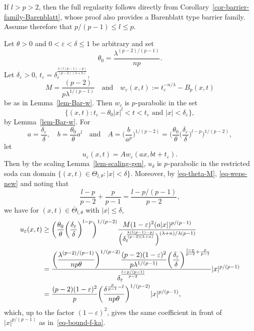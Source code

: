 \documentclass[a4paper, twoside]{article}
\makeatletter
\theoremstyle{propositional}
\theoremstyle{descriptive}
\renewenvironment{proof}[1][\proofname]{\par
  \pushQED{\qed}%
  \normalfont
  \trivlist
  \item[\hskip\labelsep
        \itshape
    #1\@addpunct{.}]\ignorespaces
}{%
  \popQED\endtrivlist\@endpefalse
}
\numberwithin{equation}{section}
\newcommand{\eps}{\varepsilon}
\newcommand{\de}{\delta}
\newcommand{\p}{{$p\mspace{1mu}$}}
\newcommand{\la}{\lambda}
\makeatother
\begin{document}
\begin{proof}[Second proof of Proposition~\ref{prop-small-reg},
based on Barenblatt type barriers]
If $l >p>2$, then the full regularity follows
directly from Corollary~\ref{cor-barrier-family-Barenblatt},
whose proof also provides a Barenblatt type barrier family.
Assume therefore that $p/(p-1)\le l\le p$.

Let 
$\theta>0$ and $0<\eps < \de \le1$  be arbitrary and set
\[
\theta_0 =\frac{\la^{(p-2)/(p-1)}}{np}.
\]
Let $\de_\eps>0$, $t_\eps= \de_\eps^{\frac{\la (l(p-1)-p)}{(p-2)(\la+n)}}$, 
\[
   M = \frac{(p-2)}{p \la^{1/(p-1)}}
  \quad \text{and} \quad 
w_\eps(x,t):= t_\eps^{-n/\la} - B_p(x,t)
\]
be as in Lemma~\ref{lem-Bar-w}.
Then $w_\eps$ is \p-parabolic in the set
 \[
\{(x,t): t_\eps - \theta_0 |x|^l< t < t_\eps
\text{ and }  |x| <  \de_\eps\}, 
\]
by Lemma~\ref{lem-Bar-w}.
For
\[
a=\frac{\de_\eps}{\de}, \quad 
b= \frac{\theta_0}{\theta} a^l  
\quad \text{and} \quad
A = \biggl( \frac{b}{a^p} \biggr)^{1/(p-2)} 
= \biggl( \frac{\theta_0}{\theta} \biggl( \frac{\de_\eps}{\de} \biggr)^{l-p} \biggr)^{1/(p-2)},
\]
let 
\begin{equation}   \label{eq-def-u-eps-from-w}
u_\eps(x,t) = A w_\eps(ax, bt+t_\eps).
\end{equation}
Then by the scaling Lemma~\ref{lem-scaling-gen},
$u_\de$ is \p-parabolic in 
the restricted soda can domain $\{(x,t) \in \Theta_{l,\theta}: |x|<\de\}$.
Moreover, by \eqref{eq-theta-M}, \eqref{eq-weps-new} and noting that
\[
\frac{l-p}{p-2}+\frac{p}{p-1} = \frac{l-p/(p-1)}{p-2},
\]
we have
for $(x,t)\in \overline{\Theta}_{l,\theta}$ with $|x|\le\de$,
\begin{align}
u_\eps(x,t)  
&\ge \biggl( \frac{\theta_0}{\theta} \biggl( \frac{\de_\eps}{\de} \biggr)^{l-p} \biggr)^{1/(p-2)} 
   \frac{M(1-\eps)^2 (a|x|)^{p/(p-1)}} { \Bigl( \de_\eps^{\frac{\la (l(p-1)-p)}{(p-2)(\la+n)}} 
   \Bigr)^{(\la+n)/\la(p-1)}} \nonumber \\
&= \frac{\displaystyle   \biggl( \frac{\la^{(p-2)/(p-1)}}{np\theta} \biggr)^{1/(p-2)}  
    \frac{(p-2)(1-\eps)^2}{p\la^{1/(p-1)}} 
\biggl( \frac{\de_\eps}{\de} \biggr)^{\frac{l-p}{p-2}+\frac{p}{p-1}} }
{\de_\eps^{\frac{l-p/(p-1)}{p-2}}}|x|^{p/(p-1)} \nonumber \\
&= \frac{(p-2)(1-\eps)^2}{p} \biggl( \frac{\de^{\frac{p}{p-1}-l}}{np\theta} \biggr)^{1/(p-2)}
|x|^{p/(p-1)},
\label{eq-est-u-eps}
\end{align}
which, up to the factor $(1-\eps)^2$,
gives the same coefficient in front of $|x|^{p/(p-1)}$ 
as in~\eqref{eq-bound-f-ka}.

\end{proof}
\end{document}
